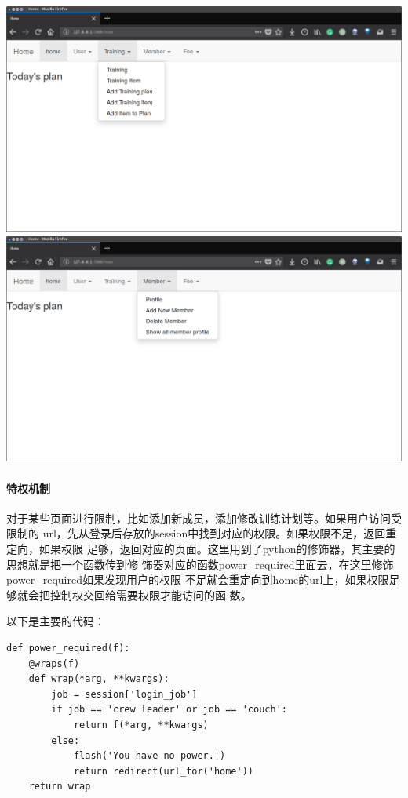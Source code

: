   \includegraphics[width=\textwidth]{figure/admin-login}
  \includegraphics[width=\textwidth]{figure/admin-login2}

\vspace{3em}
\paragraph{特权机制}
对于某些页面进行限制，比如添加新成员，添加修改训练计划等。如果用户访问受限制的
url，先从登录后存放的session中找到对应的权限。如果权限不足，返回重定向，如果权限
足够，返回对应的页面。这里用到了python的修饰器，其主要的思想就是把一个函数传到修
饰器对应的函数power\_required里面去，在这里修饰power\_required如果发现用户的权限
不足就会重定向到home的url上，如果权限足够就会把控制权交回给需要权限才能访问的函
数。

\vspace{3em}
以下是主要的代码：
\begin{Verbatim}[]
def power_required(f):
    @wraps(f)
    def wrap(*arg, **kwargs):
        job = session['login_job']
        if job == 'crew leader' or job == 'couch':
            return f(*arg, **kwargs)
        else:
            flash('You have no power.')
            return redirect(url_for('home'))
    return wrap
\end{Verbatim}

